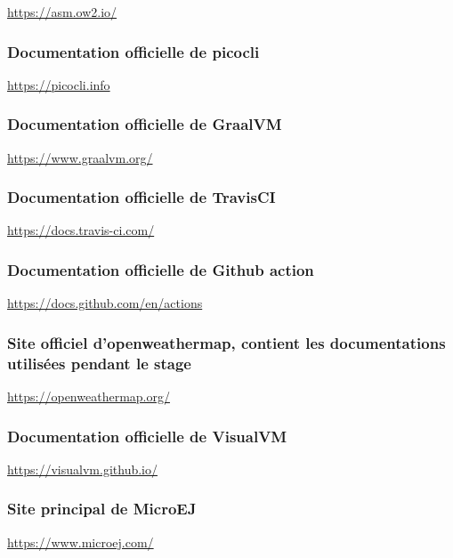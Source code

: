 \documentclass[french,a4paper,12pt]{report}
\begin{document}
\href{https://asm.ow2.io/}{https://asm.ow2.io/}

\subsubsection{Documentation officielle de picocli}

\href{https://picocli.info}{https://picocli.info}

\subsubsection{Documentation officielle de GraalVM}

\href{https://www.graalvm.org/}{https://www.graalvm.org/}

\subsubsection{Documentation officielle de TravisCI}

\href{https://docs.travis-ci.com/}{https://docs.travis-ci.com/}

\subsubsection{Documentation officielle de Github action}

\href{https://docs.github.com/en/actions}{https://docs.github.com/en/actions}

\subsubsection{Site officiel d'openweathermap, contient les documentations utilisées pendant le stage}

\href{https://openweathermap.org/}{https://openweathermap.org/}

\subsubsection{Documentation officielle de VisualVM}

\href{https://visualvm.github.io/}{https://visualvm.github.io/}

\subsubsection{Site principal de MicroEJ}

\href{https://www.microej.com/}{https://www.microej.com/}
\end{document}
